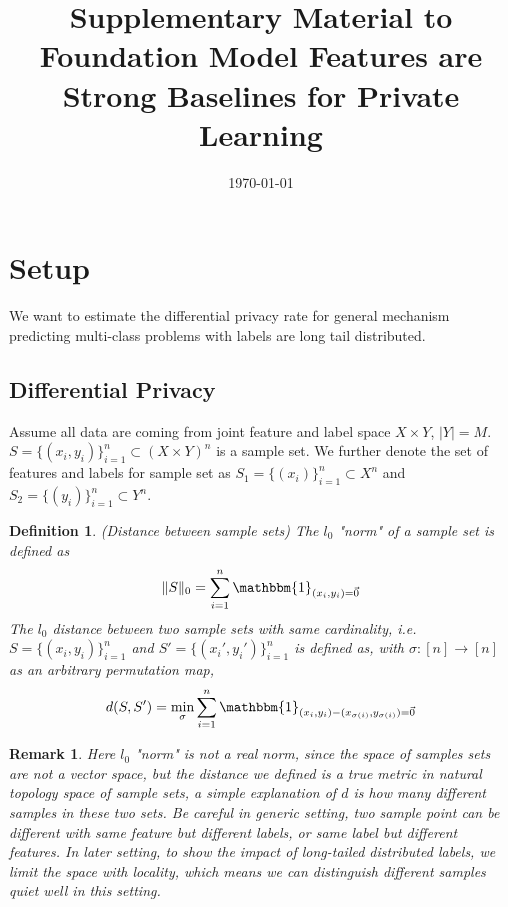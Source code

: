 \documentclass[12pt]{article}
\numberwithin{theorem}{section} %
\newtheorem{definition}{Definition}
\numberwithin{definition}{section} %
\numberwithin{assumption}{section} %
\numberwithin{lemma}{section} %
\newtheorem{remark}{Remark}
\numberwithin{remark}{section} %
\numberwithin{prop}{section} %
\numberwithin{corollary}{section} %
\numberwithin{example}{section} %
\numberwithin{question}{section} %
\numberwithin{problem}{section} %
\numberwithin{conjecture}{section} %
\numberwithin{append}{section} %
\numberwithin{property}{section} %
\begin{document}
	\title{Supplementary Material to \\ Foundation Model Features are Strong Baselines for Private Learning}
	\date{\today}
	\maketitle
	\vspace{-1em}
	
	\setcounter{section}{0}
	
	\section{Setup}
	
	We want to estimate the differential privacy rate for general mechanism predicting multi-class problems with labels are long tail distributed.
	
	\subsection{Differential Privacy}
	
	Assume all data are coming from joint feature and label space $X\times Y$, $|Y|=M$. $S=\{(x_i,y_i)\}_{i=1}^n\subset (X\times Y)^n$ is a sample set. We further denote the set of features and labels for sample set as $S_1=\{(x_i)\}_{i=1}^n\subset X^n$ and $S_2=\{(y_i)\}_{i=1}^n\subset Y^n$.
	
	\begin{definition}(Distance between sample sets)
		The $l_0$ "norm" of a sample set is defined as 
		\begin{equation}
			\lVert S \rVert_0 = \sum\limits_{i=1}^n \mathbbm{1}_{(x_i,y_i)=\vec{0}}
		\end{equation}
	The $l_0$ distance between two sample sets with same cardinality, i.e. $S=\{(x_i,y_i)\}_{i=1}^n$ and $S'=\{(x_i',y_i')\}_{i=1}^n$ is defined as, with $\sigma : [n]\to [n]$ as an arbitrary permutation map,
	\begin{equation}
		d(S,S')=\underset{\sigma}{\min}\sum\limits_{i=1}^n   \mathbbm{1}_{(x_i,y_i)-(x_{\sigma(i)},y_{\sigma(i)})=\vec{0}}
	\end{equation}

	\end{definition}

\begin{remark}
	Here $l_0$ "norm" is not a real norm, since the space of samples sets are not a vector space, but the distance we defined is a true metric in natural topology space of sample sets, a simple explanation of $d$ is how many different samples in these two sets. Be careful in generic setting, two sample point can be different with same feature but different labels, or same label but different features. In later setting, to show the impact of long-tailed distributed labels, we limit the space with locality, which means we can distinguish different samples quiet well in this setting.
\end{remark}
	
\end{document}
